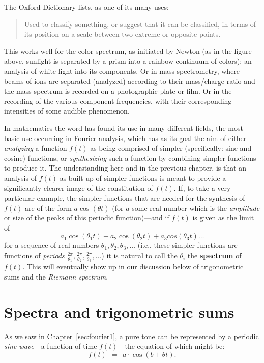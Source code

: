\documentclass[openany]{book}
\theoremstyle{plain}
\theoremstyle{definition}
\begin{document}
{  The Oxford Dictionary lists, as one of its many uses:

\begin{quote} Used to classify something, or suggest that it can be classified, in terms of its position on a scale between two extreme or opposite points.\end{quote}

This works well for the color spectrum, as initiated by Newton (as in the figure above, sunlight is separated by a prism into a rainbow  continuum of colors): an analysis of white light into its components. Or in mass spectrometry, where
 beams of ions are separated (analyzed) according to their
mass/charge ratio and the mass spectrum is recorded on a photographic plate or film.  Or in the recording of the various component frequencies, with their  corresponding intensities of some audible phenomenon.

 In mathematics the word  has found its use in many different fields, the most basic use occurring in Fourier analysis, which has as its goal the aim of either {\it analyzing}  a function $f(t)$ as being  comprised of simpler (specifically: sine and cosine) functions, or {\it synthesizing} such a function by combining simpler functions to produce it. The understanding here and in the previous chapter, is that  an analysis of $f(t)$ as built up of simpler functions is meant to provide a significantly clearer image of the constitution of $f(t)$.  If, to take a very particular example, the simpler functions  that are needed for the synthesis of $f(t)$ are of the form $a\cos(\theta t)$  (for $a$ some real number which is the {\it amplitude} or size of the peaks of this periodic function)---and  if $f(t)$ is given as the limit of $$a_1\cos(\theta_1t) +  a_2\cos(\theta_2t) + a_3cos(\theta_3t) \dots$$  for a sequence of real numbers $\theta_1, \theta_2,
 \theta_3,
 \dots$  (i.e., these simpler functions are functions of {\it periods} ${\frac{2\pi}{\theta_1}}, {\frac{2\pi}{\theta_2}}, {\frac{2\pi}{\theta_3}}, \dots$) it is natural to call the $\theta_i$ the  {\bf spectrum} of $f(t)$.
   This will eventually show up in our discussion  below of trigonometric sums and the {\it Riemann spectrum}.


 \chapter{Spectra and trigonometric sums \label{sec:trigsums}}

As we saw in Chapter~\ref{sec:fourier1}, a pure tone can be represented by a periodic {\it sine wave}---a function of  time $f(t)$---the equation of which might be:
$$f(t)\ \ = \ \ a\cdot \cos(b +\theta t).$$

}
\end{document}
